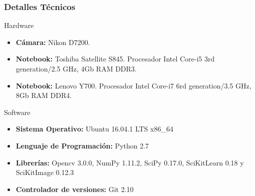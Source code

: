 \begin{frame}
\frametitle{Detalles Técnicos}
\FontDetalleTecnico
\begin{block}{Hardware}

   \begin{itemize}
   \item \textbf{Cámara:} Nikon D7200.
   \item \textbf{Notebook:} Toshiba Satellite S845. Procesador Intel Core-i5 3rd generation/2.5 GHz, 4Gb RAM DDR3.
   \item \textbf{Notebook:} Lenovo Y700. Procesador Intel Core-i7 6rd generation/3.5 GHz, 8Gb RAM DDR4.
   \end{itemize}
   
\end{block}

\begin{block}{Software}
   \begin{itemize}
   \item \textbf{Sistema Operativo:} Ubuntu 16.04.1 LTS x86\_64
   \item \textbf{Lenguaje de Programación:} Python 2.7
   \item \textbf{Librerías:} Opencv 3.0.0, NumPy 1.11.2, SciPy 0.17.0, SciKitLearn 0.18 y SciKitImage 0.12.3
   \item \textbf{Controlador de versiones:} Git 2.10
   \end{itemize}
   
\end{block}

\end{frame}


